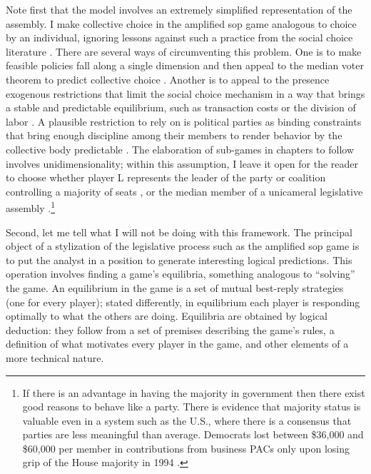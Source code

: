 Note first that the model involves an extremely simplified representation of the assembly.  I make collective choice in the amplified sop game analogous to choice by an individual, ignoring lessons against such a practice from the social choice literature \citep{plott.1967,mckelvey.1976,schofield.1983,riker.1980}. There are several ways of circumventing this problem.  One is to make feasible policies fall along a single dimension and then appeal to the median voter theorem to predict collective choice \citep{black.1958,tsebelis.money.1997}.  Another is to appeal to the presence exogenous restrictions that limit the social choice mechanism in a way that brings a stable and predictable equilibrium, such as transaction costs \citep{sloss.1973,lupia.mccubbins.1997} or the division of labor \citep{shepsle.1979}.  A plausible restriction to rely on is political parties as binding constraints that bring enough discipline among their members to render behavior by the collective body predictable \citep{cox.mccubbins.1994}. The elaboration of sub-games in chapters to follow involves unidimensionality; within this assumption, I leave it open for the reader to choose whether player L represents the leader of the party or coalition controlling a majority of seats \citep{cox.mccubbins.2005}, or the median member of a unicameral legislative assembly \citep{krehbiel.1998}.\footnote{If there is an advantage in having the majority in government then there exist good reasons to behave like a party.  There is evidence that majority status is valuable even in a system such as the U.S., where there is a consensus that parties are less meaningful than average.  Democrats lost between \$36,000 and \$60,000 per member in contributions from business PACs only upon losing grip of the House majority in 1994 \citep{cox.magar.1999,cox.magar.nd}.}

Second, let me tell what I will not be doing with this framework.  The principal object of a stylization of the legislative process such as the amplified sop game is to put the analyst in a position to generate interesting logical predictions.  This operation involves finding a game's equilibria, something analogous to ``solving'' the game.  An equilibrium in the game is a set of mutual best-reply strategies (one for every player); stated differently, in equilibrium each player is responding optimally to what the others are doing.  Equilibria are obtained by logical deduction: they follow from a set of premises describing the game's rules, a definition of what motivates every player in the game, and other elements of a more technical nature.  

